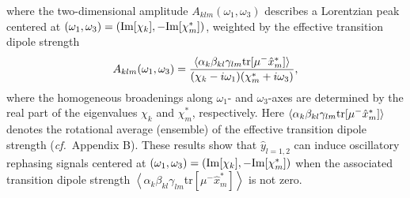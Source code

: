 \documentclass[%
 reprint,%
 amssymb, amsmath,%
 aip,cha,%
]{revtex4-1}
\begin{document}
where the two-dimensional amplitude $A_{klm}(\omega_1,\omega_3)$ describes a Lorentzian peak centered at $(\omega_1,\omega_3)=({\rm Im}[\chi_k],-{\rm Im}[\chi_{m}^{*}])$, weighted by the effective transition dipole strength
\begin{equation}
	A_{klm}(\omega_1,\omega_3)=\frac{\left\langle\alpha_{k}\beta_{kl}\gamma_{lm}{\rm tr}[\mu^{-}\hat{x}_{m}^{*}]\right\rangle}{(\chi_k-i\omega_1)(\chi_{m}^{*}+i\omega_3)},
\end{equation}
where the homogeneous broadenings along $\omega_1$- and $\omega_3$-axes are determined by the real part of the eigenvalues $\chi_k$ and $\chi_{m}^{*}$, respectively.  Here $\left\langle\alpha_{k}\beta_{kl}\gamma_{lm}{\rm tr}[\mu^{-}\hat{x}_{m}^{*}]\right\rangle$ denotes the rotational average (ensemble) of the effective transition dipole strength ({\it cf.}~Appendix B). These results show that $\hat{y}_{l=1,2}$ can induce oscillatory rephasing signals centered at $(\omega_1,\omega_3)=({\rm Im}[\chi_{k}],-{\rm Im}[\chi_{m}^{*}])$ when the associated transition dipole strength $\left<\alpha_k \beta_{kl} \gamma_{lm}\right.$tr$\left.\left[\mu^- \hat{x}_m^{*}\right] \right>$ is not zero.
\end{document}
